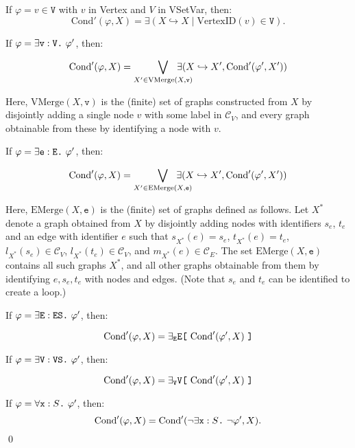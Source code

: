 \documentclass{llncs}
\newcommand{\mt}[1]{\text{\tt{#1}}}
\begin{document}
\begin{theorem}
	If $\varphi = v \in \mathtt{V}$ with $v$ in Vertex and $V$ in VSetVar, then:
		\[\text{Cond}'(\varphi,X) = \exists (X\hookrightarrow X\mid \text{VertexID}(v) \in \mathtt{V}).\]

	If $\varphi = \exists \mathtt{v}:\mathtt{V}\mt{.}\ \varphi'$, then:

	\[ \text{Cond}'(\varphi,X) = \bigvee_{X'\in\text{VMerge}(X,\mathtt{v})} \hspace{-0.25in}\exists(X\hookrightarrow X', \text{Cond}'(\varphi',X')) \]

	\noindent Here, $\text{VMerge}(X,\mathtt{v})$ is the (finite) set of graphs constructed from $X$ by disjointly adding a single node $v$ with some label in $\mathcal{C}_V$, and every graph obtainable from these by identifying a node with $v$.

	If $\varphi = \exists \mathtt{e}:\mathtt{E}\mt{.}\ \varphi'$, then:

	\[ \text{Cond}'(\varphi,X) =  \bigvee_{X'\in\text{EMerge}(X,\mathtt{e})} \hspace{-0.25in}\exists ( X\hookrightarrow X',\text{Cond}'(\varphi',X')) \]

	\noindent Here, $\text{EMerge}(X,\mathtt{e})$ is the (finite) set of graphs defined as follows. Let $X^*$ denote a graph obtained from $X$ by disjointly adding nodes with identifiers $s_{e}$, $t_{e}$ and an edge with identifier $e$ such that $s_{X^*}(e) = s_{e}$, $t_{X^*}(e) = t_{e}$, $l_{X^*}(s_{e}) \in \mathcal{C}_V$, $l_{X^*}(t_{e}) \in \mathcal{C}_V$, and $m_{X^*}(e) \in \mathcal{C}_E$. The set $\text{EMerge}(X,\mathtt{e})$ contains all such graphs $X^*$, and all other graphs obtainable from them by identifying $e,s_{e},t_{e}$ with nodes and edges. (Note that $s_e$ and $t_e$ can be identified to create a loop.)
	
	If $\varphi = \exists \mathtt{E}:\mathtt{ES}\mt{.}\ \varphi'$, then:
	
	\[ \text{Cond}'(\varphi,X) = \exists_\mathtt{E}\mathtt{E} \mt{[}\ \text{Cond}'(\varphi',X)\ \mt{]} \]
	
	If $\varphi = \exists \mathtt{V}:\mathtt{VS}\mt{.}\ \varphi'$, then:
	
	\[ \text{Cond}'(\varphi,X) = \exists_\mathtt{V}\mathtt{V} \mt{[}\ \text{Cond}'(\varphi',X)\ \mt{]} \]

	If $\varphi = \forall \mathtt{x}:S\mt{.}\ \varphi'$, then:
	\[\text{Cond}'(\varphi,X) = \text{Cond}'(\neg\exists \mathtt{x}:S\mt{.}\ \neg\varphi', X).\]
	\qed
	\end{theorem}
	
\end{document}
